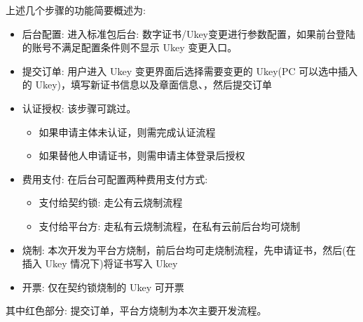 上述几个步骤的功能简要概述为:
\begin{itemize}
    \item 后台配置: 进入标准包后台: 数字证书/Ukey变更进行参数配置，如果前台登陆的账号不满足配置条件则不显示 Ukey 变更入口。
    \item 提交订单: 用户进入 Ukey 变更界面后选择需要变更的 Ukey(PC 可以选中插入的 Ukey)，填写新证书信息以及章面信息、，然后提交订单
    \item 认证授权: 该步骤可跳过。
    \begin{itemize}
        \item 如果申请主体未认证，则需完成认证流程
        \item 如果替他人申请证书，则需申请主体登录后授权
    \end{itemize}
    \item 费用支付: 在后台可配置两种费用支付方式:
    \begin{itemize}
        \item 支付给契约锁: 走公有云烧制流程
        \item 支付给平台方: 走私有云烧制流程，在私有云前后台均可烧制
    \end{itemize}
    \item 烧制: 本次开发为平台方烧制，前后台均可走烧制流程，先申请证书，然后(在插入 Ukey 情况下)将证书写入 Ukey
    \item 开票: 仅在契约锁烧制的 Ukey 可开票
\end{itemize}

其中红色部分: 提交订单，平台方烧制为本次主要开发流程。

\newpage